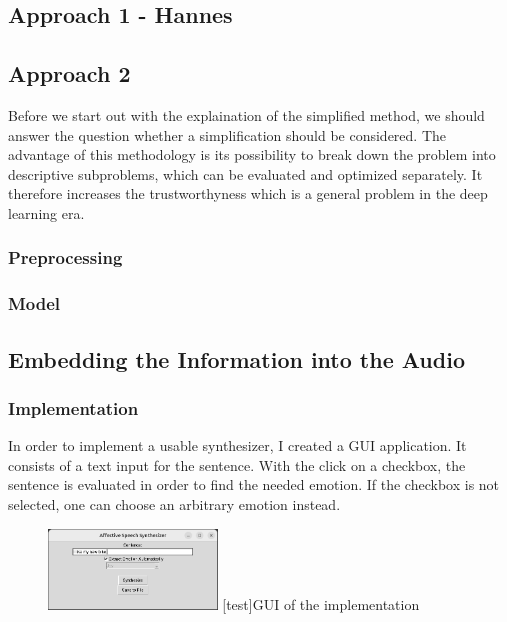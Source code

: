 \documentclass[11pt]{article}
\begin{document}
\subsection{Approach 1 - Hannes}
\subsection{Approach 2}

Before we start out with the explaination of the simplified method, we should answer the question whether a simplification should be considered. The advantage of this methodology is its possibility to break down the problem into descriptive subproblems, which can be evaluated and optimized separately. It therefore increases the trustworthyness which is a general problem in the deep learning era.

\subsubsection{Preprocessing}

\subsubsection{Model}

\subsection{Embedding the Information into the Audio}

\subsubsection{Implementation}

In order to implement a usable synthesizer, I created a GUI application. It consists of a text input for the sentence. With the click on a checkbox, the sentence is evaluated in order to find the needed emotion. If the checkbox is not selected, one can choose an arbitrary emotion instead. 

\begin{figure}[h]
 \centering
\includegraphics[width=0.4\textwidth]{"Bilder/GUI.png"}
[test]{GUI of the implementation}
\end{figure}
\end{document}
